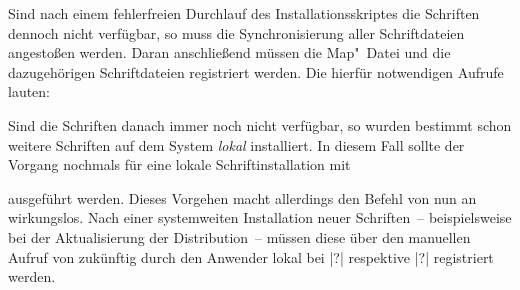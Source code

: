 Sind nach einem fehlerfreien Durchlauf des Installationsskriptes die Schriften 
dennoch nicht verfügbar, so muss die Synchronisierung aller Schriftdateien 
angestoßen werden. Daran anschließend müssen die Map"~Datei und die 
dazugehörigen Schriftdateien registriert werden. Die hierfür notwendigen 
Aufrufe lauten:
%
\begin{quoting}
\newline
{}\newline
{}
\end{quoting}
%
Sind die Schriften danach immer noch nicht verfügbar, so wurden bestimmt schon 
weitere Schriften auf dem System \emph{lokal} installiert. In diesem Fall 
sollte der Vorgang nochmals für eine lokale Schriftinstallation mit 
%
\begin{quoting}
\newline
{}\newline
{}
\end{quoting}
%
ausgeführt werden. Dieses Vorgehen macht allerdings den Befehl 
 von nun an wirkungslos. Nach einer systemweiten Installation 
neuer Schriften~-- beispielsweise bei der Aktualisierung der Distribution~-- 
müssen diese über den manuellen Aufruf von  zukünftig durch den 
Anwender lokal bei |?| respektive 
|?| registriert werden.



